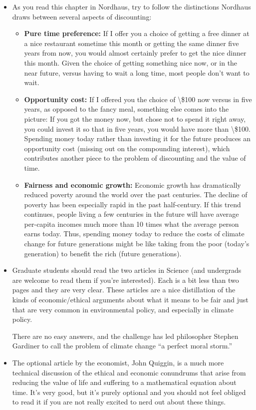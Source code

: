 \documentclass[
]{article}
\providecommand{\tightlist}{%
  \setlength{\itemsep}{0pt}\setlength{\parskip}{0pt}}
\begin{document}
\begin{itemize}
\item
  As you read this chapter in Nordhaus, try to follow the distinctions
  Nordhaus draws between several aspects of discounting:

  \begin{itemize}
  \tightlist
  \item
    \textbf{Pure time preference:} If I offer you a choice of getting a
    free dinner at a nice restaurant sometime this month or getting the
    same dinner five years from now, you would almost certainly prefer
    to get the nice dinner this month. Given the choice of getting
    something nice now, or in the near future, versus having to wait a
    long time, most people don't want to wait.
  \item
    \textbf{Opportunity cost:} If I offered you the choice of
    \textbackslash\$100 now versus in five years, as opposed to the
    fancy meal, something else comes into the picture: If you got the
    money now, but chose not to spend it right away, you could invest it
    so that in five years, you would have more than \textbackslash\$100.
    Spending money today rather than investing it for the future
    produces an opportunity cost (missing out on the compounding
    interest), which contributes another piece to the problem of
    discounting and the value of time.
  \item
    \textbf{Fairness and economic growth:} Economic growth has
    dramatically reduced poverty around the world over the past
    centuries. The decline of poverty has been especially rapid in the
    past half-century. If this trend continues, people living a few
    centuries in the future will have average per-capita incomes much
    more than 10 times what the average person earns today. Thus,
    spending money today to reduce the costs of climate change for
    future generations might be like taking from the poor (today's
    generation) to benefit the rich (future generations).
  \end{itemize}
\item
  Graduate students should read the two articles in Science (and
  undergrads are welcome to read them if you're interested). Each is a
  bit less than two pages and they are very clear. These articles are a
  nice distillation of the kinds of economic/ethical arguments about
  what it means to be fair and just that are very common in
  environmental policy, and especially in climate policy.

  There are no easy answers, and the challenge has led philosopher
  Stephen Gardiner to call the problem of climate change ``a perfect
  moral storm.''
\item
  The optional article by the economist, John Quiggin, is a much more
  technical discussion of the ethical and economic conundrums that arise
  from reducing the value of life and suffering to a mathematical
  equation about time. It's very good, but it's purely optional and you
  should not feel obliged to read it if you are not really excited to
  nerd out about these things.
\end{itemize}
\end{document}

